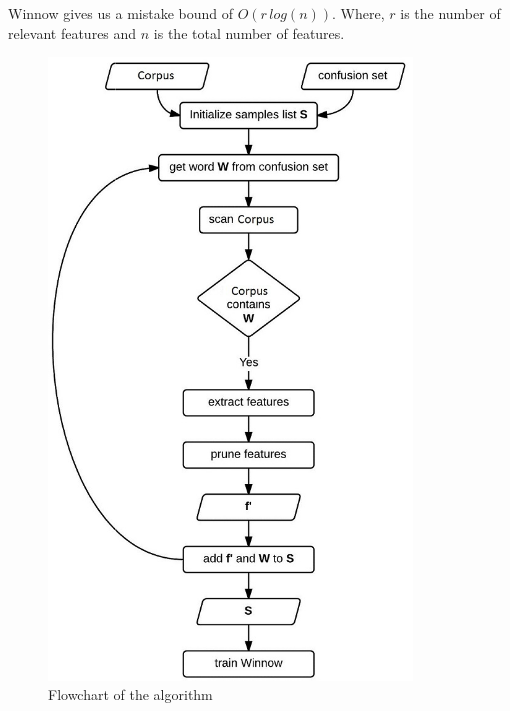 Winnow gives us a mistake bound of \(O(r\, log(n))\). Where, \(r\) is the number
of relevant features and \(n\) is the total number of features.

\begin{figure}[h]
    \centering
    \caption{Flowchart of the algorithm}
    \includegraphics[height=165mm]{img/Flowchart.jpeg}
\end{figure}
\null\vfill
